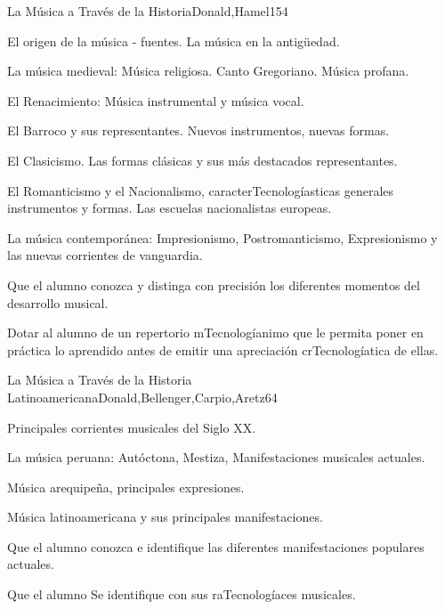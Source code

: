 \begin{syllabus}
\begin{unit}{La Música a Través de la Historia}{Donald,Hamel}{15}{4}
\begin{topics}
	\item El origen de la música - fuentes. La música en la antigüedad.
	\item La música medieval: Música religiosa.  Canto Gregoriano. Música profana.
	\item El Renacimiento: Música instrumental y música vocal.
	\item El Barroco y sus representantes. Nuevos instrumentos, nuevas formas.
	\item El Clasicismo. Las formas clásicas y sus más destacados representantes.
	\item El Romanticismo y el Nacionalismo, caracterTecnologíasticas generales instrumentos y formas. Las escuelas nacionalistas europeas.
	\item La música contemporánea: Impresionismo, Postromanticismo, Expresionismo y las nuevas corrientes de vanguardia.
\end{topics}
\begin{learningoutcomes}
	\item Que el alumno conozca y distinga con precisión los diferentes momentos del desarrollo musical.
	\item Dotar al alumno de un repertorio mTecnologíanimo que le permita poner en práctica lo aprendido antes de emitir una apreciación crTecnologíatica de ellas.
\end{learningoutcomes}
\end{unit}

\begin{unit}{La Música a Través de la Historia Latinoamericana}{Donald,Bellenger,Carpio,Aretz}{6}{4}
\begin{topics}
	\item Principales corrientes musicales del Siglo XX.
	\item La música peruana: Autóctona, Mestiza, Manifestaciones musicales actuales.
	\item Música arequipeña, principales expresiones.
	\item Música latinoamericana y sus principales manifestaciones.
\end{topics}
\begin{learningoutcomes}
	\item Que el alumno conozca e identifique las diferentes manifestaciones populares actuales. 
	\item Que el alumno Se identifique con sus raTecnologíaces musicales.
\end{learningoutcomes}
\end{unit}



\begin{coursebibliography}
\end{coursebibliography}

\end{syllabus}
